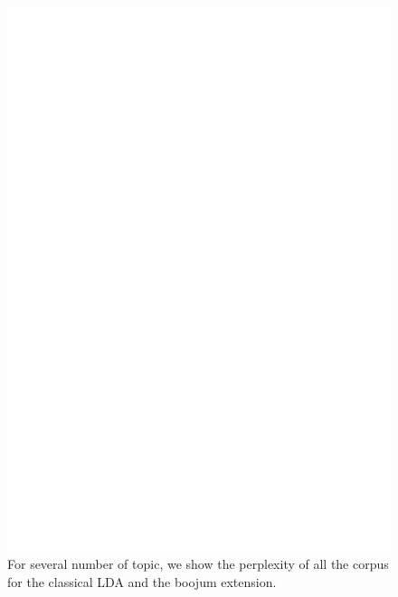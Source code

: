 \begin{figure}[h]
\label{fig:pp_K}
\includegraphics[scale=0.4]{results/pp_K.eps}
\caption{For several number of topic, we show the perplexity of all the corpus for the classical LDA and the boojum extension.}
\end{figure}

